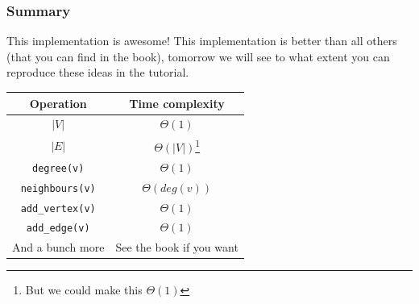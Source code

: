 \begin{frame}
	\frametitle{Summary}

		\begin{exampleblock}{This implementation is awesome!}
			This implementation is better than all others (that you can find in the book), tomorrow we will see to what extent you can
			reproduce these ideas in the tutorial.
		\end{exampleblock}	

		\pause
		\begin{tabular}{c | c}
		Operation & Time complexity \\
		\midrule
		$|V|$ & $\Theta(1)$ \\
		$|E|$ & $\Theta(|V|)$\footnote{But we could make this $\Theta(1)$} \\
		\pause
		\texttt{degree(v)} & $\Theta(1)$ \\
		\texttt{neighbours(v)} & $\Theta(\mathit{deg}(v))$ \\
		\pause
		\texttt{add\_vertex(v)} & $\Theta(1)$ \\
		\texttt{add\_edge(v)} & $\Theta(1)$ \\
		\pause
		And a bunch more & See the book if you want\\
		\end{tabular}
\end{frame}
